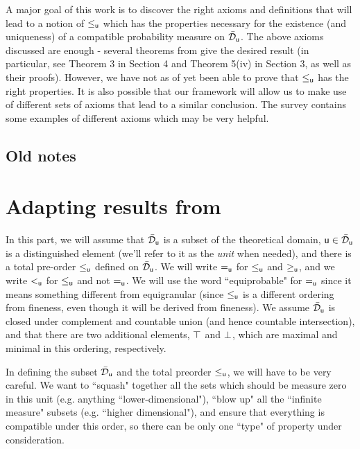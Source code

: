 \documentclass[10pt, onecolumn, longbibliography, nofootinbib]{revtex4-2}
\begin{document}
A major goal of this work is to discover the right axioms and definitions that will lead to a notion of $\lequ$ which has the properties necessary for the existence (and uniqueness) of a compatible probability measure on $\tdomain_{\stmt[u]}$. The above axioms discussed are enough - several theorems from \cite{villegas} give the desired result (in particular, see Theorem 3 in Section 4 and Theorem 5(iv) in Section 3, as well as their proofs). However, we have not as of yet been able to prove that $\lequ$ has the right properties. It is also possible that our framework will allow us to make use of different sets of axioms that lead to a similar conclusion. The survey \cite{fishburnsurvey} contains some examples of different axioms which may be very helpful. 

\subsection{Old notes}

\section{Adapting results from \cite{villegas}}

In this part, we will assume that $\tdomain_{\stmt[u]}$ is a subset of the theoretical domain, $\stmt[u]\in \tdomain_{\stmt[u]}$ is a distinguished element (we'll refer to it as the \emph{unit} when needed), and there is a total pre-order $\leq_{\stmt[u]}$ defined on $\tdomain_{\stmt[u]}$. We will write $=_{\stmt[u]}$ for $\leq_{\stmt[u]}$ and $\geq_{\stmt[u]}$, and we write $<_{\stmt[u]}$ for $\leq_{\stmt[u]}$ and not $=_{\stmt[u]}$. We will use the word ``equiprobable" for $=_{\stmt[u]}$ since it means something different from equigranular (since $\leq_{\stmt[u]}$ is a different ordering from fineness, even though it will be derived from fineness). We assume $\tdomain_{\stmt[u]}$ is closed under complement and countable union (and hence countable intersection), and that there are two additional elements, $\certainty$ and $\impossibility$, which are maximal and minimal in this ordering, respectively.

\begin{remark}
	In defining the subset $\tdomain_{\stmt[u]}$ and the total preorder $\leq_{\stmt[u]}$, we will have to be very careful. We want to ``squash" together all the sets which should be measure zero in this unit (e.g. anything ``lower-dimensional"), ``blow up" all the ``infinite measure" subsets (e.g. ``higher dimensional"), and ensure that everything is compatible under this order, so there can be only one ``type" of property under consideration. 
\end{remark}
\end{document}
